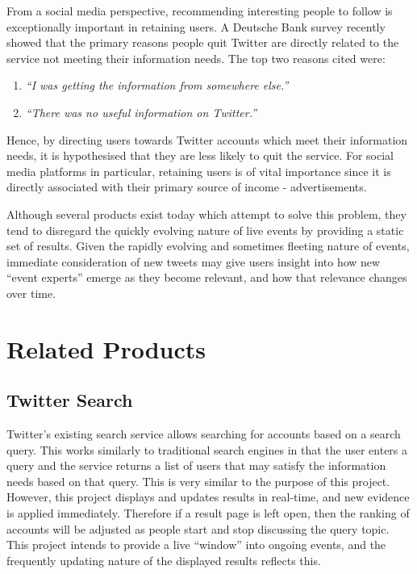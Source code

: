 \documentclass{l4proj}
\begin{document}
From a social media perspective, recommending interesting people to follow is exceptionally important in retaining users. A Deutsche Bank survey recently showed that the primary reasons people quit Twitter are directly related to the service not meeting their information needs. The top two reasons cited were:

\begin{enumerate}
    \item \textit{``I was getting the information from somewhere else.'' }
    \item \textit{``There was no useful information on Twitter.''}
\end{enumerate}

Hence, by directing users towards Twitter accounts which meet their information needs, it is hypothesised that they are less likely to quit the service. For social media platforms in particular, retaining users is of vital importance since it is directly associated with their primary source of income - advertisements.

Although several products exist today which attempt to solve this problem, they tend to disregard the quickly evolving nature of live events by providing a static set of results. Given the rapidly evolving and sometimes fleeting nature of events, immediate consideration of new tweets may give users insight into how new ``event experts'' emerge as they become relevant, and how that relevance changes over time.

\section{Related Products}

\subsection{Twitter Search}
Twitter's existing search service allows searching for accounts based on a search query. This works similarly to traditional search engines in that the user enters a query and the service returns a list of users that may satisfy the information needs based on that query. This is very similar to the purpose of this project. However, this project displays and updates results in real-time, and new evidence is applied immediately. Therefore if a result page is left open, then the ranking of accounts will be adjusted as people start and stop discussing the query topic. This project intends to provide a live ``window'' into ongoing events, and the frequently updating nature of the displayed results reflects this.
\end{document}
